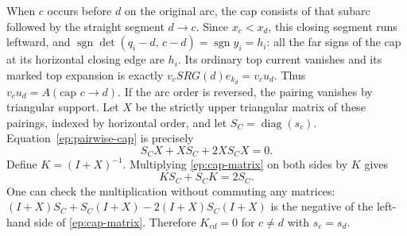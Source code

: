 \documentclass[11pt,letterpaper]{article}
\numberwithin{equation}{section}
\theoremstyle{definition}
\theoremstyle{remark}
\begin{document}
When $c$ occurs before $d$ on the original arc, the cap consists of that
subarc followed by the straight segment $d\to c$.  Since $x_c<x_d$, this
closing segment runs leftward, and
$\operatorname{sgn}\det(q_i-d,\,c-d)=\operatorname{sgn}y_i=h_i$: all the
far signs of the cap at its horizontal closing edge are $h_i$.  Its ordinary top current vanishes
and its marked top expansion is exactly $v_cSRG(d)e_{k_d}=v_cu_d$.
Thus $v_cu_d=A(\text{cap }c\to d)$.  If the arc order is reversed,
the pairing vanishes by triangular support.  Let $X$ be the strictly
upper triangular matrix of these pairings, indexed by horizontal order,
and let $S_C=\operatorname{diag}(s_c)$.  Equation~\eqref{ep:pairwise-cap}
is precisely
\begin{equation}
 S_CX+XS_C+2XS_CX=0.
 \label{ep:cap-matrix}
\end{equation}
Define $K=(I+X)^{-1}$.  Multiplying \eqref{ep:cap-matrix} on both sides
by $K$ gives
\begin{equation}
 KS_C+S_CK=2S_C.
 \label{ep:K}
\end{equation}
One can check the multiplication without commuting any matrices:
$(I+X)S_C+S_C(I+X)-2(I+X)S_C(I+X)$ is the negative of the left-hand
side of \eqref{ep:cap-matrix}.  Therefore $K_{cd}=0$ for $c\ne d$
with $s_c=s_d$.
\end{document}
